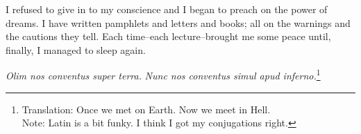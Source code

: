 \documentclass{article}
\begin{document}
I refused to give in to my conscience and I began to preach
on the power of dreams.
I have written pamphlets and letters and books;
all on the warnings and the cautions they tell.
Each time--each lecture--brought me some peace
until, finally, I managed to sleep again.
%
%
%
%
%
%
%
%
%
%
%
%
%
%
\VV

\begin{center}
\textit{Olim nos conventus super terra.}
\textit{Nunc nos conventus simul apud inferno.}\footnote{
Translation:  Once we met on Earth. Now we meet in Hell. \\
\indent
Note: Latin is a bit funky.  I think I got my conjugations right.
}
\end{center}
\end{document}
